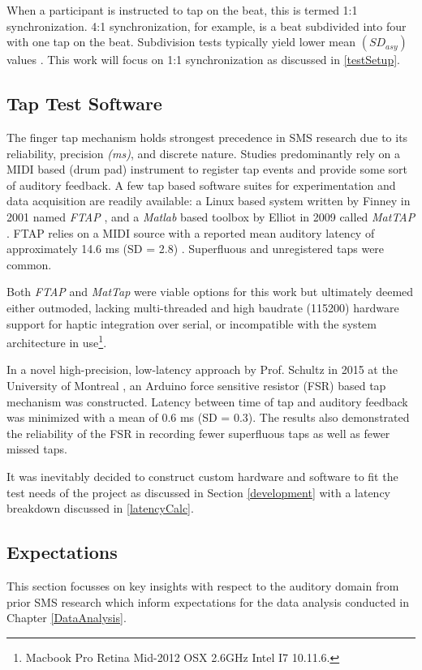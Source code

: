 When a participant is instructed to tap on the beat, this is termed 1:1 synchronization. 4:1 synchronization, for example, is a beat subdivided into four with one tap on the beat. Subdivision tests typically yield lower mean $(SD_{asy})$ values \cite{repp2013sensorimotor}. This work will focus on 1:1 synchronization as discussed in \ref{testSetup}.

\subsection{Tap Test Software} \label{ttsw}
The finger tap mechanism holds strongest precedence in SMS research due to its reliability, precision \textit{(ms)}, and discrete nature. Studies predominantly rely on a MIDI based (drum pad) instrument to register tap events and provide some sort of auditory feedback. A few tap based software suites for experimentation and data acquisition are readily available: a Linux based system written by Finney in 2001 named \textit{FTAP} \cite{finney2001ftap}, and a \textit{Matlab} based toolbox by Elliot in 2009 called \textit{MatTAP} \cite{elliott2009mattap}. FTAP relies on a MIDI source with a reported mean auditory latency of approximately 14.6 ms (SD = 2.8) \cite{schultz2016tap}. Superfluous and unregistered taps were common.

Both \textit{FTAP} and \textit{MatTap} were viable options for this work but ultimately deemed either outmoded, lacking multi-threaded and high baudrate (115200) hardware support for haptic integration over serial, or incompatible with the system architecture in use\footnote{Macbook Pro Retina Mid-2012 OSX 2.6GHz Intel I7 10.11.6.}.

In a novel high-precision, low-latency approach by Prof. Schultz in 2015 at the University of Montreal \cite{schultz2016tap}, an Arduino force sensitive resistor (FSR) based tap mechanism was constructed. Latency between time of tap and auditory feedback was minimized with a mean of 0.6 ms (SD = 0.3). The results also demonstrated the reliability of the FSR in recording fewer superfluous taps as well as fewer missed taps.

It was inevitably decided to construct custom hardware and software to fit the test needs of the project as discussed in Section \ref{development} with a latency breakdown discussed in \ref{latencyCalc}.

\subsection{Expectations} \label{SMSFindings}
This section focusses on key insights with respect to the auditory domain from prior SMS research which inform expectations for the data analysis conducted in Chapter \ref{DataAnalysis}.

